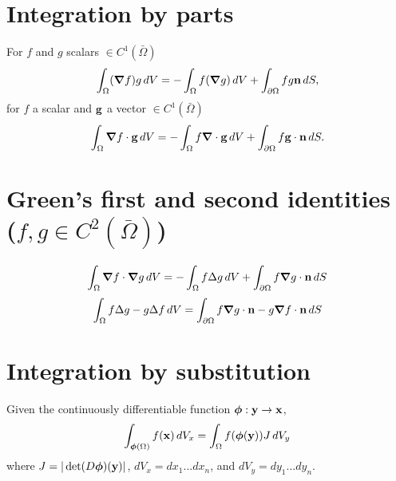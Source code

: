 \documentclass[oneside,a4paper,11pt]{report}
\begin{document}
\section{Integration by parts}
For $f$ and $g$ scalars $\in C^1(\bar{\Omega})$
\[\int_{\Omega} (\bm \nabla f)g \,dV = - \int_{\Omega} f (\bm \nabla g) \,dV + \int_{\partial \Omega} fg \mathbf{n} \,dS,\]
for $f$ a scalar and $\mathbf{g}$ a vector $\in C^1(\bar{\Omega})$
\[\int_{\Omega} \bm \nabla f \cdot \mathbf{g} \,dV = - \int_{\Omega} f \bm \nabla \cdot \mathbf{g} \,dV + \int_{\partial \Omega} f \mathbf{g} \cdot \mathbf{n} \,dS.\]

\section{Green's first and second identities ($f,g \in C^2(\bar{\Omega})$)}
\[\int_{\Omega} \bm \nabla f \cdot \bm \nabla g \,dV = -\int_{\Omega} f \Delta g \,dV + \int_{\partial \Omega} f \bm \nabla g \cdot \mathbf{n} \,dS\]
\[\int_{\Omega} f \Delta g - g \Delta f \,dV = \int_{\partial \Omega} f \bm \nabla g \cdot \mathbf{n} - g \bm \nabla f \cdot \mathbf{n} \, dS\] 

\section{Integration by substitution}
Given the continuously differentiable function $\bm \phi: \mathbf{y} \to \mathbf{x}$,
\[\int_{\bm \phi(\Omega)}f(\mathbf{x}) \, dV_x = \int_{\Omega} f(\bm \phi(\mathbf{y})) J \,dV_y \]
where $J = |\det (D\bm \phi)(\mathbf{y})|$, $dV_x = dx_1...dx_n$, and $dV_y = dy_1...dy_n$.
\end{document}
